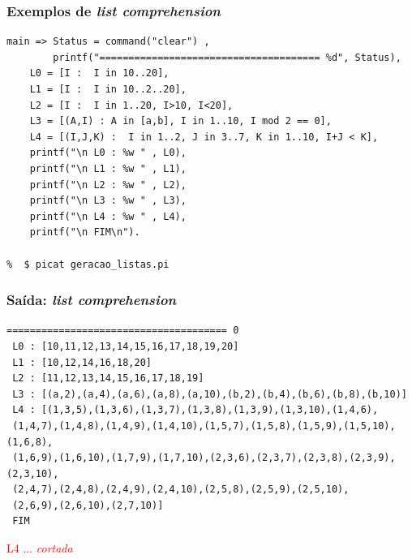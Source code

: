\begin{frame}[fragile]

\frametitle{Exemplos de \textit{list comprehension}}
\begin{footnotesize}
\begin{verbatim}
main => Status = command("clear") ,
		printf("====================================== %d", Status),
    L0 = [I :  I in 10..20],
    L1 = [I :  I in 10..2..20],
    L2 = [I :  I in 1..20, I>10, I<20],
    L3 = [(A,I) : A in [a,b], I in 1..10, I mod 2 == 0],
    L4 = [(I,J,K) :  I in 1..2, J in 3..7, K in 1..10, I+J < K],
    printf("\n L0 : %w " , L0),
    printf("\n L1 : %w " , L1),
    printf("\n L2 : %w " , L2),
    printf("\n L3 : %w " , L3),
    printf("\n L4 : %w " , L4),
    printf("\n FIM\n").
    
%  $ picat geracao_listas.pi    
\end{verbatim}
\end{footnotesize}
\end{frame}



\begin{frame}[fragile]

\frametitle{Saída: \textit{list comprehension}}

\begin{footnotesize}
\begin{verbatim}
====================================== 0
 L0 : [10,11,12,13,14,15,16,17,18,19,20] 
 L1 : [10,12,14,16,18,20] 
 L2 : [11,12,13,14,15,16,17,18,19] 
 L3 : [(a,2),(a,4),(a,6),(a,8),(a,10),(b,2),(b,4),(b,6),(b,8),(b,10)] 
 L4 : [(1,3,5),(1,3,6),(1,3,7),(1,3,8),(1,3,9),(1,3,10),(1,4,6),
 (1,4,7),(1,4,8),(1,4,9),(1,4,10),(1,5,7),(1,5,8),(1,5,9),(1,5,10),(1,6,8),
 (1,6,9),(1,6,10),(1,7,9),(1,7,10),(2,3,6),(2,3,7),(2,3,8),(2,3,9),(2,3,10),
 (2,4,7),(2,4,8),(2,4,9),(2,4,10),(2,5,8),(2,5,9),(2,5,10),
 (2,6,9),(2,6,10),(2,7,10)] 
 FIM
\end{verbatim}
\end{footnotesize}

\textcolor{red}{L4 ... \textit{cortada}}
\end{frame}




